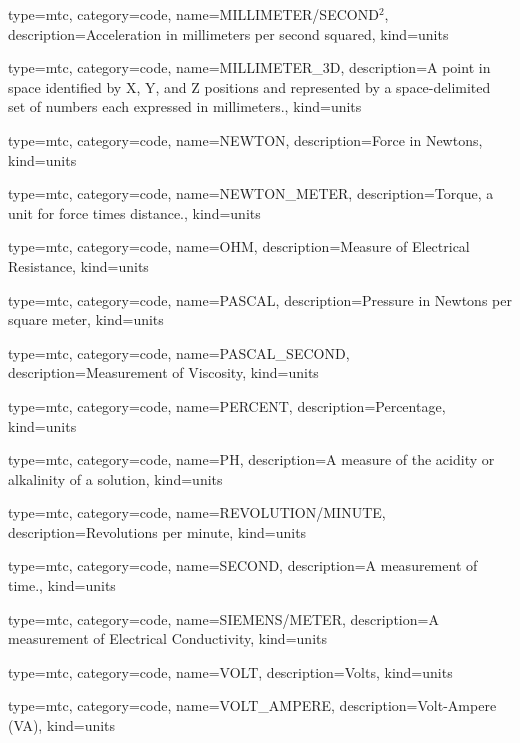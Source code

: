 {
  type=mtc,
  category=code,
  name={MILLIMETER/SECOND$^2$},
  description={Acceleration in millimeters per second squared},
  kind={units}
}


{
  type=mtc,
  category=code,
  name={MILLIMETER\_3D},
  description={A point in space identified by X, Y, and Z positions and represented by a space-delimited set of numbers each expressed in millimeters.},
  kind={units}
}


{
  type=mtc,
  category=code,
  name={NEWTON},
  description={Force in Newtons},
  kind={units}
}


{
  type=mtc,
  category=code,
  name={NEWTON\_METER},
  description={Torque, a unit for force times distance.},
  kind={units}
}


{
  type=mtc,
  category=code,
  name={OHM},
  description={Measure of Electrical Resistance},
  kind={units}
}


{
  type=mtc,
  category=code,
  name={PASCAL},
  description={Pressure in Newtons per square meter},
  kind={units}
}


{
  type=mtc,
  category=code,
  name={PASCAL\_SECOND},
  description={Measurement of Viscosity},
  kind={units}
}


{
  type=mtc,
  category=code,
  name={PERCENT},
  description={Percentage},
  kind={units}
}


{
  type=mtc,
  category=code,
  name={PH},
  description={A measure of the acidity or alkalinity of a solution},
  kind={units}
}


{
  type=mtc,
  category=code,
  name={REVOLUTION/MINUTE},
  description={Revolutions per minute},
  kind={units}
}


{
  type=mtc,
  category=code,
  name={SECOND},
  description={A measurement of time.},
  kind={units}
}


{
  type=mtc,
  category=code,
  name={SIEMENS/METER},
  description={A measurement of Electrical Conductivity},
  kind={units}
}


{
  type=mtc,
  category=code,
  name={VOLT},
  description={Volts},
  kind={units}
}


{
  type=mtc,
  category=code,
  name={VOLT\_AMPERE},
  description={Volt-Ampere  (VA)},
  kind={units}
}


